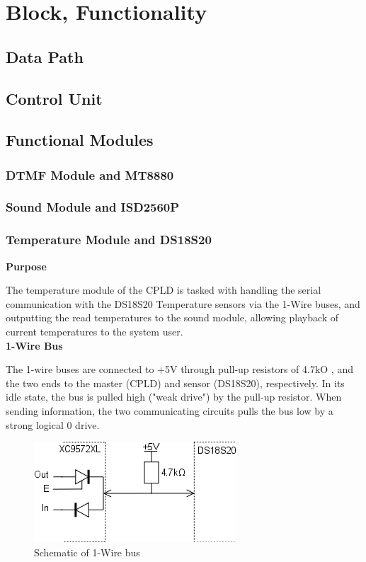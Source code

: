 \documentclass[a4paper,11pt]{article}
\begin{document}
\section{Block, Functionality}

	\subsection{Data Path}

	\subsection{Control Unit}

	\subsection{Functional Modules}

		\subsubsection{DTMF Module and MT8880}
	
		\subsubsection{Sound Module and ISD2560P}

		\subsubsection{Temperature Module and DS18S20}

{\bf Purpose}

The temperature module of the CPLD is tasked with handling the serial communication with
the DS18S20 Temperature sensors via the 1-Wire buses, and outputting the read temperatures
to the sound module, allowing playback of current temperatures to the system user.\\

{\noindent \bf 1-Wire Bus}

The 1-wire buses are connected to +5V through pull-up resistors of 4.7kO , and the
two ends to the master (CPLD) and sensor (DS18S20), respectively. In its idle state, the
bus is pulled high ("weak drive") by the pull-up resistor. When sending information, the
two communicating circuits pulls the bus low by a strong logical 0 drive. \\

	\begin{figure}[h!tb]
	  \centering
	      \includegraphics[scale=0.5, angle=0]{TempBus.png}
	  	\caption{Schematic of 1-Wire bus}
	\end{figure}
\end{document}
